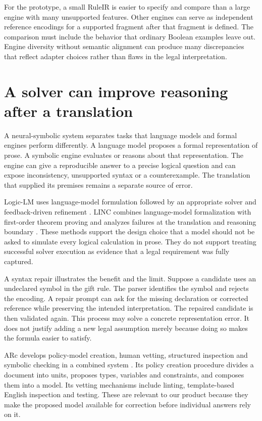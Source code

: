 \documentclass[12pt,a4paper,oneside,openany]{book}
\begin{document}
For the prototype, a small RuleIR is easier to specify and compare than a
large engine with many unsupported features. Other engines can serve as
independent reference encodings for a supported fragment after that fragment
is defined. The comparison must include the behavior that ordinary Boolean
examples leave out. Engine diversity without semantic alignment can produce
many discrepancies that reflect adapter choices rather than flaws in the
legal interpretation.

\section{A solver can improve reasoning after a translation}
\label{sec:languages-neurosymbolic}
A neural-symbolic system separates tasks that language models and formal
engines perform differently. A language model proposes a formal representation
of prose. A symbolic engine evaluates or reasons about that representation.
The engine can give a reproducible answer to a precise logical question and
can expose inconsistency, unsupported syntax or a counterexample. The
translation that supplied its premises remains a separate source of error.

Logic-LM uses language-model formulation followed by an appropriate solver and
feedback-driven refinement \citep[sec.~3 and prompt appendices]{logiclm2023}.
LINC combines language-model formalization with first-order theorem proving
and analyzes failures at the translation and reasoning boundary
\citep[method and error analysis]{linc2023}. These methods support the design
choice that a model should not be asked to simulate every logical calculation
in prose. They do not support treating successful solver execution as evidence
that a legal requirement was fully captured.

A syntax repair illustrates the benefit and the limit. Suppose a candidate
uses an undeclared symbol in the gift rule. The parser identifies the symbol
and rejects the encoding. A repair prompt can ask for the missing declaration
or corrected reference while preserving the intended interpretation. The
repaired candidate is then validated again. This process may solve a concrete
representation error. It does not justify adding a new legal assumption
merely because doing so makes the formula easier to satisfy.

ARc develops policy-model creation, human vetting, structured inspection and
symbolic checking in a combined system \citep[sec.~3 and appendix A]{arc2025}.
Its policy creation procedure divides a document into units, proposes types,
variables and constraints, and composes them into a model. Its vetting
mechanisms include linting, template-based English inspection and testing.
These are relevant to our product because they make the proposed model
available for correction before individual answers rely on it.
\end{document}
